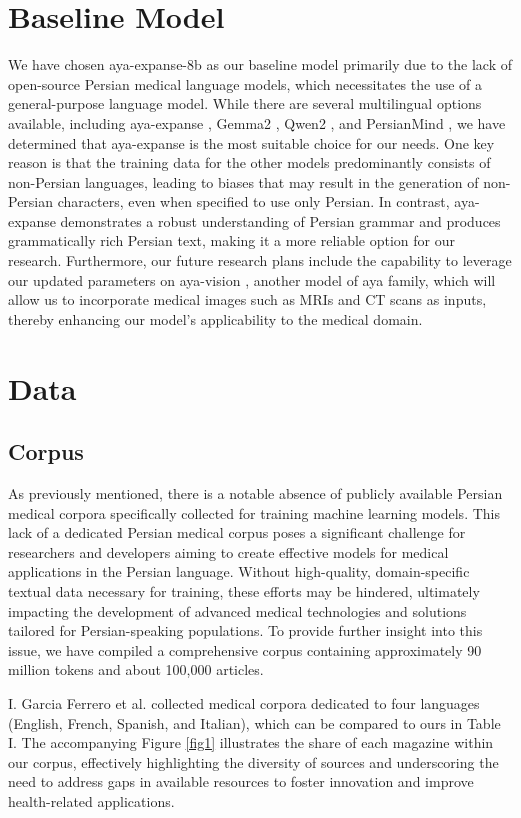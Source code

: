\documentclass[conference]{IEEEtran}
\begin{document}
	\section{Baseline Model}
	We have chosen aya-expanse-8b as our baseline model primarily due to the lack of open-source Persian medical language models, which necessitates the use of a general-purpose language model. While there are several multilingual options available, including aya-expanse \cite{b5}, Gemma2 \cite{b15}, Qwen2 \cite{b16}, and PersianMind \cite{b17}, we have determined that aya-expanse is the most suitable choice for our needs. One key reason is that the training data for the other models predominantly consists of non-Persian languages, leading to biases that may result in the generation of non-Persian characters, even when specified to use only Persian. In contrast, aya-expanse demonstrates a robust understanding of Persian grammar and produces grammatically rich Persian text, making it a more reliable option for our research. Furthermore, our future research plans include the capability to leverage our updated parameters on aya-vision
	\cite{b18}
	, another model of aya family, which will allow us to incorporate medical images such as MRIs and CT scans as inputs, thereby enhancing our model’s applicability to the medical domain.
	\section{Data}
	
	\subsection{Corpus}
	As previously mentioned, there is a notable absence of publicly available Persian medical corpora specifically collected for training machine learning models. This lack of a dedicated Persian medical corpus poses a significant challenge for researchers and developers aiming to create effective models for medical applications in the Persian language. Without high-quality, domain-specific textual data necessary for training, these efforts may be hindered, ultimately impacting the development of advanced medical technologies and solutions tailored for Persian-speaking populations. To provide further insight into this issue, we have compiled a comprehensive corpus containing approximately 90 million tokens and about 100,000 articles. 
	
	I. Garcia Ferrero et al.
	\cite{b19}
	collected medical corpora dedicated to four languages (English, French, Spanish, and Italian), which can be compared to ours in Table I. The accompanying Figure \ref{fig1} illustrates the share of each magazine within our corpus, effectively highlighting the diversity of sources and underscoring the need to address gaps in available resources to foster innovation and improve health-related applications.
	
\end{document}
